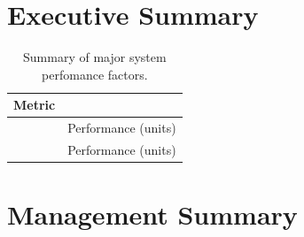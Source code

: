 \documentclass[report]{byu-aero}
\begin{document}


\setcounter{page}{2} %
\thispagestyle{tocpage} %
\tableofcontents %

\clearpage
\newpage

\section{Executive Summary} %
\label{sec:ExecutiveSummary}


\begin{table}[h!]
	\centering
	\caption{Summary of major system perfomance factors.}
	\label{tab:performancesummary}
	\begin{tabular}{ |c|c| } 
		\hline
		\rowcolor{BYUbluemid}
    	Metric & \\ 
		\hline
	     & Performance (units) \\ 
		\hline
		 & Performance (units) \\ 
		\hline
	\end{tabular}
\end{table}

\section{Management Summary} %
\label{sec:ManagementSummary}
\end{document}
